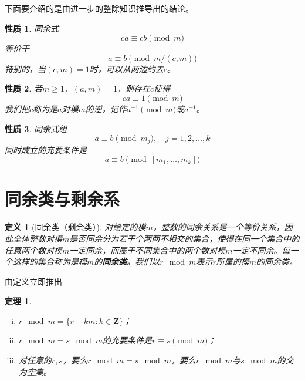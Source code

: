 \documentclass{ctexrep}
\newcommand{\bbold}[1]{\textbf{#1}}
\newcommand{\Z}{\boldsymbol{Z}}
\newtheorem{thrm}{定理}[section]
\newtheorem{prop}{性质}[section]
\newtheorem{defn}{定义}[section]
\begin{document}
下面要介绍的是由进一步的整除知识推导出的结论。

\begin{prop}
同余式
\begin{equation}
ca\equiv cb\pmod{m}
\end{equation}
等价于
\begin{displaymath}
a\equiv b\pmod{m/(c,m)}
\end{displaymath}
特别的，当$(c,m)=1$时，可以从两边约去$c$。
\end{prop}

\begin{prop}
若$m\geq 1$，$(a,m)=1$，则存在$c$使得
\begin{equation}
ca\equiv 1\pmod{m}
\end{equation}
我们把$c$称为是$a$对模$m$的逆，记作$a^{-1}\pmod{m}$或$a^{-1}$。
\end{prop}

\begin{prop}
同余式组
\begin{displaymath}
a\equiv b\pmod{m_j},\quad j=1,2,\dotsc,k
\end{displaymath}
同时成立的充要条件是
\begin{displaymath}
a\equiv b\pmod{[m_1,\dotsc,m_k]}
\end{displaymath}
\end{prop}

\section{同余类与剩余系}

\begin{defn}[同余类（剩余类）]
对给定的模$m$，整数的同余关系是一个等价关系，因此全体整数对模$m$是否同余分为若干个两两不相交的集合，使得在同一个集合中的任意两个数对模$m$一定同余，而属于不同集合中的两个数对模$m$一定不同余。每一个这样的集合称为是模$m$的\bbold{同余类}。我们以$r\mod m$表示$r$所属的模$m$的同余类。
\end{defn}

由定义立即推出

\begin{thrm}
\begin{enumerate}[(i)]
\item $r\mod m=\{r+km:k\in \Z\}$；
\item $r\mod m=s\mod m$的充要条件是$r\equiv s\pmod{m}$；
\item 对任意的$r,s$，要么$r\mod m=s\mod m$，要么$r\mod m$与$s\mod m$的交为空集。
\end{enumerate}
\end{thrm}
\end{document}
